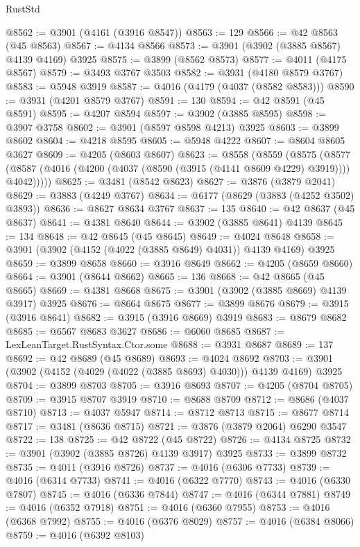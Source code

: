 \begin{lexlean}{RustStd}
\begin{coremodule}
@8562 := @3901 (@4161 (@3916 @8547))
@8563 := 129
@8566 := @42 @8563 (@45 @8563)
@8567 := @4134 @8566
@8573 := @3901 (@3902 (@3885 @8567) @4139 @4169) @3925
@8575 := @3899 (@8562 @8573)
@8577 := @4011 (@4175 @8567)
@8579 := @3493 @3767 @3503
@8582 := @3931 (@4180 @8579 @3767)
@8583 := @5948 @3919
@8587 := @4016 (@4179 (@4037 (@8582 @8583)))
@8590 := @3931 (@4201 @8579 @3767)
@8591 := 130
@8594 := @42 @8591 (@45 @8591)
@8595 := @4207 @8594
@8597 := @3902 (@3885 @8595)
@8598 := @3907 @3758
@8602 := @3901 (@8597 @8598 @4213) @3925
@8603 := @3899 @8602
@8604 := @4218 @8595
@8605 := @5948 @4222
@8607 := @8604 @8605 @3627
@8609 := @4205 (@8603 @8607)
@8623 := @8558
    (@8559
      (@8575
        (@8577 (@8587 (@4016 (@4200 (@4037 (@8590 (@3915 (@4141 @8609 @4229) @3919)))) @4042)))))
@8625 := @3481 (@8542 @8623)
@8627 := @3876 (@3879 @2041)
@8629 := @3883 (@4249 @3767)
@8634 := @6177 (@8629 (@3883 (@4252 @3502) @3893))
@8636 := @8627 @8634 @3767
@8637 := 135
@8640 := @42 @8637 (@45 @8637)
@8641 := @4381 @8640
@8644 := @3902 (@3885 @8641) @4139
@8645 := 134
@8648 := @42 @8645 (@45 @8645)
@8649 := @4024 @8648
@8658 := @3901 (@3902 (@4152 (@4022 (@3885 @8649) @4031)) @4139 @4169) @3925
@8659 := @3899 @8658
@8660 := @3916 @8649
@8662 := @4205 (@8659 @8660)
@8664 := @3901 (@8644 @8662)
@8665 := 136
@8668 := @42 @8665 (@45 @8665)
@8669 := @4381 @8668
@8675 := @3901 (@3902 (@3885 @8669) @4139 @3917) @3925
@8676 := @8664 @8675
@8677 := @3899 @8676
@8679 := @3915 (@3916 @8641)
@8682 := @3915 (@3916 @8669) @3919
@8683 := @8679 @8682
@8685 := @6567 @8683 @3627
@8686 := @6060 @8685
@8687 := LexLeanTarget.RustSyntax.Ctor.some
@8688 := @3931 @8687
@8689 := 137
@8692 := @42 @8689 (@45 @8689)
@8693 := @4024 @8692
@8703 := @3901 (@3902 (@4152 (@4029 (@4022 (@3885 @8693) @4030))) @4139 @4169) @3925
@8704 := @3899 @8703
@8705 := @3916 @8693
@8707 := @4205 (@8704 @8705)
@8709 := @3915 @8707 @3919
@8710 := @8688 @8709
@8712 := @8686 (@4037 @8710)
@8713 := @4037 @5947
@8714 := @8712 @8713
@8715 := @8677 @8714
@8717 := @3481 (@8636 @8715)
@8721 := @3876 (@3879 @2064) @6290 @3547
@8722 := 138
@8725 := @42 @8722 (@45 @8722)
@8726 := @4134 @8725
@8732 := @3901 (@3902 (@3885 @8726) @4139 @3917) @3925
@8733 := @3899 @8732
@8735 := @4011 (@3916 @8726)
@8737 := @4016 (@6306 @7733)
@8739 := @4016 (@6314 @7733)
@8741 := @4016 (@6322 @7770)
@8743 := @4016 (@6330 @7807)
@8745 := @4016 (@6336 @7844)
@8747 := @4016 (@6344 @7881)
@8749 := @4016 (@6352 @7918)
@8751 := @4016 (@6360 @7955)
@8753 := @4016 (@6368 @7992)
@8755 := @4016 (@6376 @8029)
@8757 := @4016 (@6384 @8066)
@8759 := @4016 (@6392 @8103)

\end{coremodule}
\end{lexlean}
